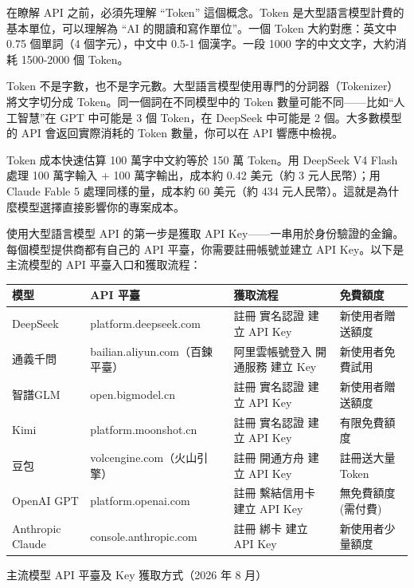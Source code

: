 
在瞭解 API 之前，必須先理解 “Token” 這個概念。Token 是大型語言模型計費的基本單位，可以理解為 “AI 的閱讀和寫作單位”。一個 Token 大約對應：英文中 0.75 個單詞（4 個字元），中文中 0.5-1 個漢字。一段 1000 字的中文文字，大約消耗 1500-2000 個 Token。

Token 不是字數，也不是字元數。大型語言模型使用專門的分詞器（Tokenizer）將文字切分成 Token。同一個詞在不同模型中的 Token 數量可能不同——比如“人工智慧”在 GPT 中可能是 3 個 Token，在 DeepSeek 中可能是 2 個。大多數模型的 API 會返回實際消耗的 Token 數量，你可以在 API 響應中檢視。

\begin{tcbinfo}{Token 成本快速估算}
100 萬字中文約等於 150 萬 Token。用 DeepSeek V4 Flash 處理 100 萬字輸入 + 100 萬字輸出，成本約 0.42 美元（約 3 元人民幣）；用 Claude Fable 5 處理同樣的量，成本約 60 美元（約 434 元人民幣）。這就是為什麼模型選擇直接影響你的專案成本。

\end{tcbinfo}


使用大型語言模型 API 的第一步是獲取 API Key——一串用於身份驗證的金鑰。每個模型提供商都有自己的 API 平臺，你需要註冊帳號並建立 API Key。以下是主流模型的 API 平臺入口和獲取流程：

\begin{center}
\begin{tabularx}{\linewidth}{|X|X|X|X|}
\hline
\textbf{模型} & \textbf{API 平臺} & \textbf{獲取流程} & \textbf{免費額度} \tabularnewline
\hline
DeepSeek & platform.deepseek.com & 註冊 實名認證 建立 API Key & 新使用者贈送額度 \tabularnewline
通義千問 & bailian.aliyun.com（百鍊平臺） & 阿里雲帳號登入 開通服務 建立 Key & 新使用者免費試用 \tabularnewline
智譜GLM & open.bigmodel.cn & 註冊 實名認證 建立 API Key & 新使用者贈送額度 \tabularnewline
Kimi & platform.moonshot.cn & 註冊 實名認證 建立 API Key & 有限免費額度 \tabularnewline
豆包 & volcengine.com（火山引擎） & 註冊 開通方舟 建立 API Key & 註冊送大量 Token \tabularnewline
OpenAI GPT & platform.openai.com & 註冊 繫結信用卡 建立 API Key & 無免費額度(需付費) \tabularnewline
Anthropic Claude & console.anthropic.com & 註冊 綁卡 建立 API Key & 新使用者少量額度 \tabularnewline
\hline
\end{tabularx}
\end{center}

\begin{center}\small\color{gray}主流模型 API 平臺及 Key 獲取方式（2026 年 8 月）\end{center}

